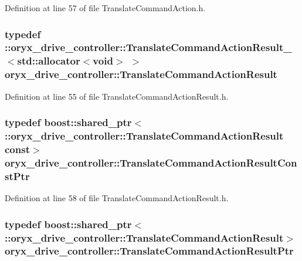 \-Definition at line 57 of file \-Translate\-Command\-Action.\-h.

\subsubsection[{\-Translate\-Command\-Action\-Result}]{\setlength{\rightskip}{0pt plus 5cm}typedef \-::{\bf oryx\-\_\-drive\-\_\-controller\-::\-Translate\-Command\-Action\-Result\-\_\-}$<$std\-::allocator$<$void$>$ $>$ {\bf oryx\-\_\-drive\-\_\-controller\-::\-Translate\-Command\-Action\-Result}}\label{namespaceoryx__drive__controller_a250b70e46b1e1bd34e13d3474663869e}


\-Definition at line 55 of file \-Translate\-Command\-Action\-Result.\-h.

\subsubsection[{\-Translate\-Command\-Action\-Result\-Const\-Ptr}]{\setlength{\rightskip}{0pt plus 5cm}typedef boost\-::shared\-\_\-ptr$<$ \-::{\bf oryx\-\_\-drive\-\_\-controller\-::\-Translate\-Command\-Action\-Result} const$>$ {\bf oryx\-\_\-drive\-\_\-controller\-::\-Translate\-Command\-Action\-Result\-Const\-Ptr}}\label{namespaceoryx__drive__controller_a288e9e55653326a8110b8f0b07811b71}


\-Definition at line 58 of file \-Translate\-Command\-Action\-Result.\-h.

\subsubsection[{\-Translate\-Command\-Action\-Result\-Ptr}]{\setlength{\rightskip}{0pt plus 5cm}typedef boost\-::shared\-\_\-ptr$<$ \-::{\bf oryx\-\_\-drive\-\_\-controller\-::\-Translate\-Command\-Action\-Result}$>$ {\bf oryx\-\_\-drive\-\_\-controller\-::\-Translate\-Command\-Action\-Result\-Ptr}}\label{namespaceoryx__drive__controller_a4a02052add9f4e1b7677ef12d6a34751}


